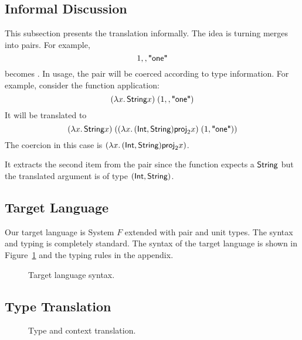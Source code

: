 \subsection{Informal Discussion}

This subsection presents the translation informally. The idea is turning merges
into pairs. For example,
\[
1 ,, \textsf{"one"}
\]
becomes  {}.
In usage, the pair will be coerced according to type information. For example,
consider the function application:
\[
(\lambda x.\, \textsf{String} x) \; (1 ,, \textsf{"one"})
\]
It will be translated to
\[
(\lambda x.\, \textsf{String} x) \; ((\lambda x.\, (\textsf{Int}, \textsf{String}) {{\textsf{proj}}_{2} x}) \; (1, \textsf{"one"}))
\]
The coercion in this case is $(\lambda x.\, (\textsf{Int}, \textsf{String}) {{\textsf{proj}}_{2} x})$.

\noindent It extracts the second item from the pair since the function expects a $\textsf{String}$
but the translated argument is of type $(\textsf{Int}, \textsf{String})$.

\subsection{Target Language}

Our target language is System $F$ extended with pair and unit types. The syntax
and typing is completely standard. The syntax of the target language is shown in
Figure~\ref{fig:f-syntax} and the typing rules in the appendix.
\begin{figure}[h]
  
  \caption{Target language syntax.}
  \label{fig:f-syntax}
\end{figure}



\subsection{Type Translation}

\begin{figure}[h]
  
  
  \caption{Type and context translation.}
  \label{fig:type-and-context-translation}
\end{figure}

